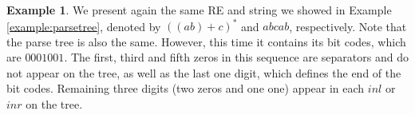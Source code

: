 \documentclass[sigplan]{acmart}
\theoremstyle{definition}
\newtheorem{Example}{Example}
\begin{document}
\begin{Example}
We present again the same RE and string we showed in Example \ref{example:parsetree}, denoted by $((ab) + c)^*$ and $abcab$, respectively. Note that the parse tree is also the same. However, this time it contains its bit codes, which are $0001001$. The first, third and fifth zeros in this sequence are separators and do not appear on the tree, as well as the last one digit, which defines the end of the bit codes. Remaining three digits (two zeros and one one) appear in each $inl$ or $inr$ on the tree.

\begin{center}
\end{center}

\end{Example}
\end{document}
